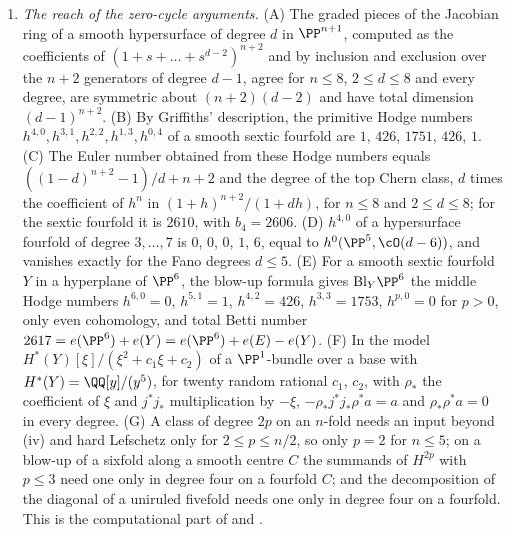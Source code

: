 \begin{enumerate}[label=\textup{(\Roman*)},leftmargin=*]
  with the action of $A[m]$: the Euler numbers $m^{3}\sigma(m)=24$, $108$,
  $448$, $750$, $2592$, the known Betti numbers for $m=3,4$, the invariant
  part equal to the Poincar\'e polynomial of $A^{[m]}$ divided by
  $(1+z)^{4}$, the rest equal to $15$, $80$, $(15,345,15)$ in degrees
  $(4,6,8)$ and $624$ for $m=2,\dots,5$, and carried only by sectors that are
  finite sets of points exactly when $m$ is prime. (I) The span of the
  elements with rational square, the compositum of the quadratic subfields,
  is $\QQ$ for $\QQ(\zeta_{7})^{+}$, $\QQ(\zeta_{9})^{+}$ and
  $\QQ(\zeta_{11})^{+}$, $\QQ(\sqrt2)$ for $\QQ(\sqrt{2+\sqrt2})$,
  $\QQ(\sqrt5)$ for $\QQ(\zeta_{15})^{+}$, and all of $\QQ(\sqrt2,\sqrt3)$.
  This is the computational part of ,
  , the remark after  and
  .

\item \emph{The reach of the zero-cycle arguments.} (A) The graded pieces
  of the Jacobian ring of a smooth hypersurface of degree $d$ in
  $\PP^{n+1}$, computed as the coefficients of
  $(1+s+\dots+s^{d-2})^{n+2}$ and by inclusion and exclusion over the $n+2$
  generators of degree $d-1$, agree for $n\le8$, $2\le d\le8$ and every
  degree, are symmetric about $(n+2)(d-2)$ and have total dimension
  $(d-1)^{n+2}$. (B) By Griffiths' description, the primitive Hodge numbers
  $h^{4,0},h^{3,1},h^{2,2},h^{1,3},h^{0,4}$ of a smooth sextic fourfold are
  $1$, $426$, $1751$, $426$, $1$. (C) The Euler number obtained from these
  Hodge numbers equals $((1-d)^{n+2}-1)/d+n+2$ and the degree of the top
  Chern class, $d$ times the coefficient of $h^{n}$ in
  $(1+h)^{n+2}/(1+dh)$, for $n\le8$ and $2\le d\le8$; for the sextic
  fourfold it is $2610$, with $b_{4}=2606$. (D) $h^{4,0}$ of a
  hypersurface fourfold of degree $3,\dots,7$ is $0$, $0$, $0$, $1$, $6$,
  equal to $h^{0}(\PP^{5},\cO(d-6))$, and vanishes exactly for the Fano
  degrees $d\le5$. (E) For a smooth sextic fourfold $Y$ in a hyperplane of
  $\PP^{6}$, the blow-up formula gives $\mathrm{Bl}_{Y}\PP^{6}$ the middle
  Hodge numbers $h^{6,0}=0$, $h^{5,1}=1$, $h^{4,2}=426$, $h^{3,3}=1753$,
  $h^{p,0}=0$ for $p>0$, only even cohomology, and total Betti number
  $2617=e(\PP^{6})+e(Y)=e(\PP^{6})+e(E)-e(Y)$. (F) In the model
  $H^{*}(Y)[\xi]/(\xi^{2}+c_{1}\xi+c_{2})$ of a $\PP^{1}$-bundle over a base
  with $H^{*}(Y)=\QQ[y]/(y^{5})$, for twenty random rational $c_{1}$,
  $c_{2}$, with $\rho_{*}$ the coefficient of $\xi$ and $j^{*}j_{*}$
  multiplication by $-\xi$, $-\rho_{*}j^{*}j_{*}\rho^{*}a=a$ and
  $\rho_{*}\rho^{*}a=0$ in every degree. (G) A class of degree $2p$ on an
  $n$-fold needs an input beyond (iv) and hard Lefschetz
  only for $2\le p\le n/2$, so only $p=2$ for $n\le5$; on a blow-up of a
  sixfold along a smooth centre $C$ the summands of $H^{2p}$ with $p\le3$
  need one only in degree four on a fourfold $C$; and the decomposition of
  the diagonal of a uniruled fivefold needs one only in degree four on a
  fourfold. This is the computational part of 
  and .


\end{enumerate}
